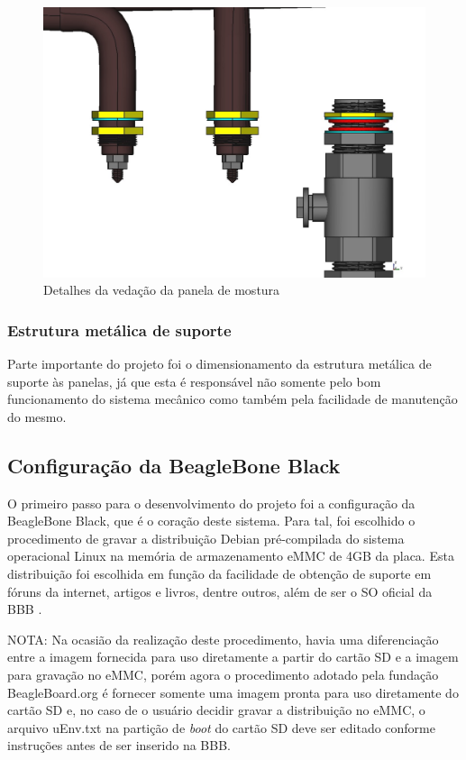 \begin{figure}[H]
	\centering
	\includegraphics[scale=0.55]{./Resources/mecsys/mash-tun-seal-color.pdf}
	\captionsetup{justification=centering}
	\caption[Detalhes da vedação da panela de mostura]{Detalhes da vedação da panela de mostura}
	\label{mt_cad_close}
\end{figure}

\subsubsection{Estrutura metálica de suporte}

Parte importante do projeto foi o dimensionamento da estrutura metálica de suporte às panelas, já que esta é responsável não somente pelo bom funcionamento do sistema mecânico como também pela facilidade de manutenção do mesmo.



\subsection{Configuração da BeagleBone Black}

O primeiro passo para o desenvolvimento do projeto foi a configuração da BeagleBone Black, que é o coração deste sistema. Para tal, foi escolhido o procedimento de gravar a distribuição Debian pré-compilada do sistema operacional Linux na memória de armazenamento eMMC de 4GB da placa. Esta distribuição foi escolhida em função da facilidade de obtenção de suporte em fóruns da internet, artigos e livros, dentre outros, além de ser o SO oficial da BBB \cite{bbb_debian}.

NOTA: Na ocasião da realização deste procedimento, havia uma diferenciação entre a imagem fornecida para uso diretamente a partir do cartão \si{\micro}SD e a imagem para gravação no eMMC, porém agora o procedimento adotado pela fundação BeagleBoard.org é fornecer somente uma imagem pronta para uso diretamente do cartão \si{\micro}SD e, no caso de o usuário decidir gravar a distribuição no eMMC, o arquivo uEnv.txt na partição de \textit{boot} do cartão \si{\micro}SD deve ser editado conforme instruções antes de ser inserido na BBB.

